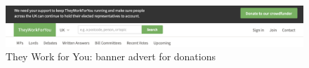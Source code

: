 \begin{figure}[h]
  \includegraphics[scale=0.3]{images/they-work-for-you-challenges-finance}
  \caption{They Work for You: banner advert for donations}
  \label{fig:they-work-for-you-challenges-finance}
\end{figure}